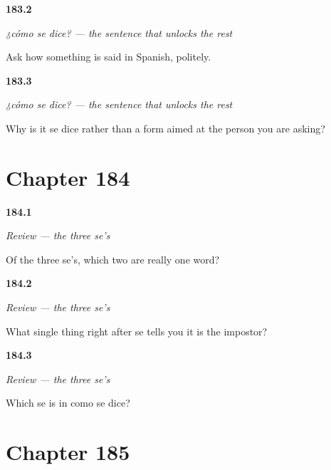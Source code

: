\noindent\begin{minipage}[t]{\linewidth}
\raggedright
\hypertarget{review-ES-C52-como-se-dice-full}{\textbf{183.2}} \emph{¿cómo se dice? — the sentence that unlocks the rest}\par
\small Ask how something is said in Spanish, politely.
\end{minipage}\par\medskip

\noindent\begin{minipage}[t]{\linewidth}
\raggedright
\hypertarget{review-ES-C52-como-se-dice-why}{\textbf{183.3}} \emph{¿cómo se dice? — the sentence that unlocks the rest}\par
\small Why is it se dice rather than a form aimed at the person you are asking?
\end{minipage}\par\medskip

\section*{Chapter 184}

\noindent\begin{minipage}[t]{\linewidth}
\raggedright
\hypertarget{review-ES-C52-tres-ses-two}{\textbf{184.1}} \emph{Review — the three se's}\par
\small Of the three se's, which two are really one word?
\end{minipage}\par\medskip

\noindent\begin{minipage}[t]{\linewidth}
\raggedright
\hypertarget{review-ES-C52-tres-ses-test}{\textbf{184.2}} \emph{Review — the three se's}\par
\small What single thing right after se tells you it is the impostor?
\end{minipage}\par\medskip

\noindent\begin{minipage}[t]{\linewidth}
\raggedright
\hypertarget{review-ES-C52-tres-ses-which}{\textbf{184.3}} \emph{Review — the three se's}\par
\small Which se is in como se dice?
\end{minipage}\par\medskip

\section*{Chapter 185}

